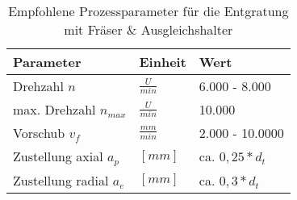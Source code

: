 \begin{table}[ht"]
	\centering
	\caption{Empfohlene Prozessparameter für die Entgratung mit Fräser \& Ausgleichshalter}
	\label{tab:empfohlene_parameter_frser}
	\begin{tabular}{@{}lll@{}}
		\toprule
		\textbf{Parameter}      & \textbf{Einheit}  & \textbf{Wert}   \\ \midrule
		Drehzahl $n$            & $\tfrac{U}{min}$  & 6.000 - 8.000   \\
		max. Drehzahl $n_{max}$ & $\tfrac{U}{min}$  & 10.000          \\
		Vorschub $v_f$          & $\tfrac{mm}{min}$ & 2.000 - 10.0000 \\
		Zustellung axial $a_p$  & $[ mm ]$          & ca. $0,25*d_t$  \\
		Zustellung radial $a_e$ & $[ mm ]$          & ca. $0,3*d_t$   \\ \bottomrule
	\end{tabular}
\end{table}
